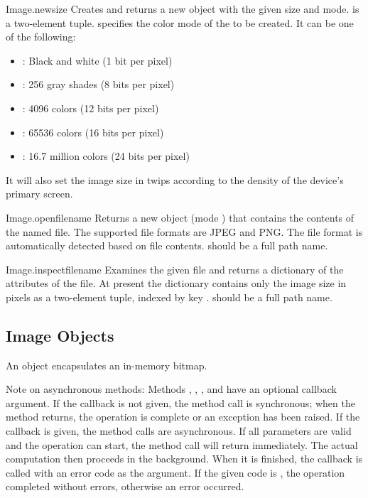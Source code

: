 \begin{funcdesc}{Image.new}{size}
Creates and returns a new  object with the given size and 
mode.  is a two-element tuple.  specifies the 
color mode of the  to be created. It can be one of the 
following:

\begin{itemize}
\item {}: Black and white (1 bit per pixel)
\item {}: 256 gray shades (8 bits per pixel)
\item {}: 4096 colors (12 bits per pixel)
\item {}: 65536 colors (16 bits per pixel)
\item {}: 16.7 million colors (24 bits per pixel)
\end{itemize}
It will also set the image size in twips according to the density of the device's primary screen. 
\end{funcdesc}

\begin{funcdesc}{Image.open}{filename}
Returns a new  object (mode ) that contains the 
contents of the named file. The supported file formats are JPEG and PNG. The 
file format is automatically detected based on file contents. 
 should be a full path name.
\end{funcdesc}

\begin{funcdesc}{Image.inspect}{filename}
Examines the given file and returns a dictionary of the attributes of the 
file. At present the dictionary contains only the image size in pixels as a 
two-element tuple, indexed by key . 
 should be a full path name.
\end{funcdesc}

\subsection{Image Objects}
\label{subsec:image-objects}
An  object encapsulates an in-memory bitmap. 

Note on asynchronous methods: Methods , , 
, and  have an optional callback argument. If the 
callback is not given, the method call is synchronous; when the method
returns, the operation is complete or an exception has been raised. If
the callback is given, the method calls are asynchronous. If all
parameters are valid and the operation can start, the method call will
return immediately.  The actual computation then proceeds in the
background. When it is finished, the callback is called with an error
code as the argument. If the given code is , the operation
completed without errors, otherwise an error occurred.

